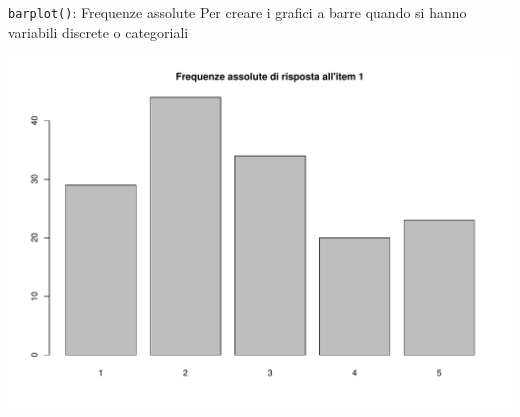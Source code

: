 \documentclass[
  ignorenonframetext,
]{beamer}
\newenvironment{Shaded}{\begin{snugshade}}{\end{snugshade}}
\newcommand{\AttributeTok}[1]{\textcolor[rgb]{0.00,0.34,0.68}{#1}}
\newcommand{\FunctionTok}[1]{\textcolor[rgb]{0.39,0.29,0.61}{#1}}
\newcommand{\NormalTok}[1]{\textcolor[rgb]{0.12,0.11,0.11}{#1}}
\newcommand{\OtherTok}[1]{\textcolor[rgb]{0.00,0.43,0.16}{#1}}
\newcommand{\SpecialCharTok}[1]{\textcolor[rgb]{0.24,0.68,0.91}{#1}}
\newcommand{\StringTok}[1]{\textcolor[rgb]{0.75,0.01,0.01}{#1}}
\begin{document}
\begin{frame}[fragile]{\texttt{barplot()}: Frequenze assolute}
\protect\hypertarget{barplot-frequenze-assolute}{}
Per creare i grafici a barre quando si hanno variabili discrete o
categoriali

\begin{Shaded}
\end{Shaded}

\begin{center}\includegraphics[width=0.7\linewidth]{Practice_files/figure-beamer/unnamed-chunk-50-1} \end{center}
\end{frame}
\end{document}

